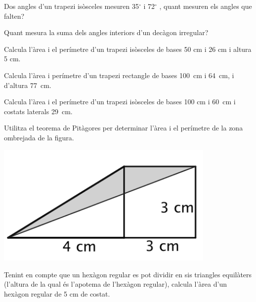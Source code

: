 \begin{mylist}
\exer  Dos angles d'un trapezi isòsceles mesuren 35${}^\circ$  i 72${}^\circ$ , quant mesuren els angles que falten?


\exer  Quant mesura la suma dels angles interiors d'un decàgon irregular? 

\exer  Calcula l'àrea i el perímetre d'un trapezi isòsceles de bases 50 cm i 26 cm i altura 5 cm.

\exer  Calcula l'àrea i perímetre d'un trapezi rectangle de bases 100~cm i 64~cm, i d'altura 77~cm.
 
\exer  Calcula l'àrea i el perímetre d'un trapezi isòsceles de bases 100 cm i 60~cm i costats laterals 29~cm.

\vspace{-1.5cm}
\exer[1] \begin{minipage}[t]{0.66\textwidth}
	 Utilitza el teorema de Pitàgores per determinar l'àrea i el perímetre de la zona ombrejada de la figura.
\end{minipage}
\begin{minipage}{0.3\textwidth}
	\centering
	\vspace{1.5cm}
\includegraphics[width=0.8\textwidth]{img-09/fig7}
\end{minipage}
 
\exer  Tenint en compte que un hexàgon regular es pot dividir en sis triangles equilàters (l'altura de la qual és l'apotema de l'hexàgon regular), calcula l'àrea d'un hexàgon regular de 5 cm de costat.


\end{mylist}

